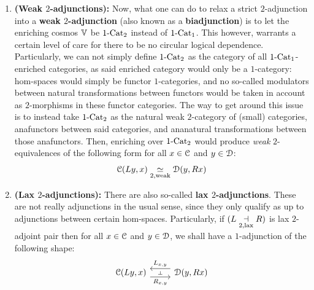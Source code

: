 \begin{remark}
\begin{enumerate}
                        \item \textbf{(Weak $2$-adjunctions):} Now, what one can do to relax a strict $2$-adjunction into a \textbf{weak $2$-adjunction} (also known as a \textbf{biadjunction}) is to let the enriching cosmos $\mathbb{V}$ be $1\text{-}\mathrm{Cat}_2$ instead of $1\text{-}\mathrm{Cat}_1$. This however, warrants a certain level of care for there to be no circular logical dependence. Particularly, we can not simply define $1\text{-}\mathrm{Cat}_2$ as the category of all $1\text{-}\mathrm{Cat}_1$-enriched categories, as said enriched category would only be a $1$-category: hom-spaces would simply be functor $1$-categories, and no so-called modulators between natural transformations between functors would be taken in account as $2$-morphisms in these functor categories. The way to get around this issue is to instead take $1\text{-}\mathrm{Cat}_2$ as the natural weak $2$-category of (small) categories, anafunctors between said categories, and ananatural transformations between those anafunctors. Then, enriching over $1\text{-}\mathrm{Cat}_2$ would produce \textit{weak} $2$-equivalences of the following form for all $x \in \mathcal{C}$ and $y \in \mathcal{D}$:
                            $$\mathcal{C}(Ly, x) \underset{2, \mathrm{weak}}{\simeq} \mathcal{D}(y, Rx)$$
                        \item \textbf{(Lax $2$-adjunctions):} There are also so-called \textbf{lax $2$-adjunctions}. These are not really adjunctions in the usual sense, since they only qualify as  up to adjunctions between certain hom-spaces. Particularly, if $(L \underset{2, \mathrm{lax}}{\dashv} R)$ is lax $2$-adjoint pair then for all $x \in \mathcal{C}$ and $y \in \mathcal{D}$, we shall have a $1$-adjunction of the following shape:
                            $$
                                \begin{tikzcd}
                                	{\C(Ly, x)} & {\D(y, Rx)}
                                	\arrow[""{name=0, anchor=center, inner sep=0}, "{R_{x, y}}"', shift right=2, from=1-1, to=1-2]
                                	\arrow[""{name=1, anchor=center, inner sep=0}, "{L_{x, y}}"', shift right=2, from=1-2, to=1-1]
                                	\arrow["\dashv"{anchor=center, rotate=-90}, draw=none, from=1, to=0]
                                \end{tikzcd}
                            $$
                    \end{enumerate}
                \end{remark}
